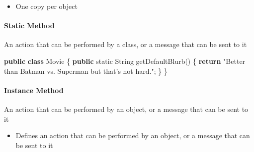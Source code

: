 \documentclass[]{article}
\newenvironment{Shaded}{}{}
\newcommand{\BuiltInTok}[1]{#1}
\newcommand{\DataTypeTok}[1]{\textcolor[rgb]{0.56,0.13,0.00}{#1}}
\newcommand{\FunctionTok}[1]{\textcolor[rgb]{0.02,0.16,0.49}{#1}}
\newcommand{\KeywordTok}[1]{\textcolor[rgb]{0.00,0.44,0.13}{\textbf{#1}}}
\newcommand{\NormalTok}[1]{#1}
\newcommand{\SpecialCharTok}[1]{\textcolor[rgb]{0.25,0.44,0.63}{#1}}
\newcommand{\StringTok}[1]{\textcolor[rgb]{0.25,0.44,0.63}{#1}}
\providecommand{\tightlist}{%
  \setlength{\itemsep}{0pt}\setlength{\parskip}{0pt}}
\let\oldparagraph\paragraph
\renewcommand{\paragraph}[1]{\oldparagraph{#1}\mbox{}}
\begin{document}
\begin{itemize}
\tightlist
\item
  One copy per object
\end{itemize}

\hypertarget{static-method}{%
\paragraph{Static Method}\label{static-method}}

An action that can be performed by a class, or a message that can be
sent to it

\begin{Shaded}
\begin{Highlighting}[]
\KeywordTok{public} \KeywordTok{class}\NormalTok{ Movie \{}
    \KeywordTok{public} \DataTypeTok{static} \BuiltInTok{String} \FunctionTok{getDefaultBlurb}\NormalTok{() \{}
        \KeywordTok{return} \StringTok{"Better than Batman vs. Superman but that's not hard."}\NormalTok{;}
\NormalTok{    \}}
\NormalTok{\}}
\end{Highlighting}
\end{Shaded}

\hypertarget{instance-method}{%
\paragraph{Instance Method}\label{instance-method}}

An action that can be performed by an object, or a message that can be
sent to it

\begin{itemize}
\tightlist
\item
  Defines an action that can be performed by an object, or a message
  that can be sent to it
\end{itemize}

\begin{Shaded}
\end{Shaded}
\end{document}

